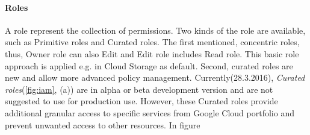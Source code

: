 \documentclass[a4paper,12pt,oneside]{report}
\begin{document}
\paragraph{Roles} A role represent the collection of permissions. Two kinds of the role 
are available, such as Primitive roles and Curated roles. The first mentioned, concentric 
roles, thus, Owner role can also Edit and Edit role includes 
Read role. This basic role approach is applied e.g. in Cloud Storage as default. Second, 
curated roles are new and allow more advanced policy management. 
Currently(28.3.2016), \textit{Curated roles}(\ref{fig:iam}, (a)) are in alpha or beta 
development version and are not suggested to use for production 
use. However, these Curated roles provide additional granular access to specific services 
from Google Cloud portfolio and prevent unwanted access to 
other resources. In figure
\end{document}
